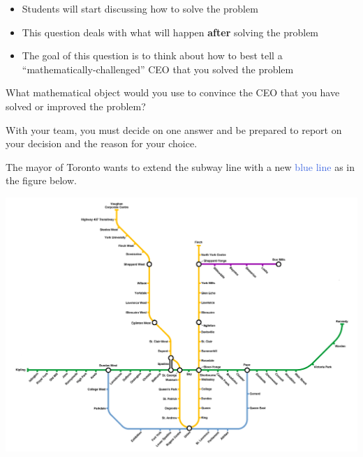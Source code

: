 \vspace{5mm}

\begin{annotation}
	\begin{notes}
		
		\begin{itemize}
			\item Students will start discussing how to solve the problem
			\item This question deals with what will happen \textbf{after} solving the problem
			\item The goal of this question is to think about how to best tell a ``mathematically-challenged'' CEO that you solved the problem
		\end{itemize}
	\end{notes}
\end{annotation}

What mathematical object would you use to convince the CEO that you have solved or improved the problem?

\begin{teamwork}
	With your team, you must decide on one answer and be prepared to report on your decision and the reason for your choice.	
\end{teamwork}

\bookonlynewpage








\question
The mayor of Toronto wants to extend the subway line with a new \textcolor{RoyalBlue}{blue line} as in the figure below.
	
	\begin{center}
	\includegraphics*[width=500pt]{images/TTC-extension.png}
	\end{center}
	
